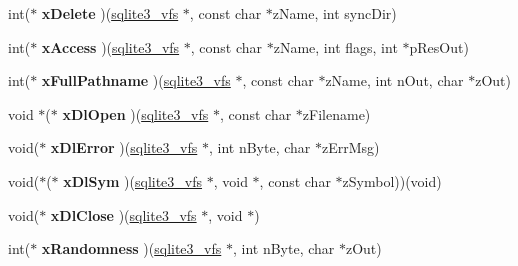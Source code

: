 \begin{DoxyCompactItemize}
\item 
int($\ast$ {\bfseries x\+Delete} )(\hyperlink{structsqlite3__vfs}{sqlite3\+\_\+vfs} $\ast$, const char $\ast$z\+Name, int sync\+Dir)\hypertarget{structsqlite3__vfs_a5f547a3e54f91c7ebef140d51054bbc0}{}\label{structsqlite3__vfs_a5f547a3e54f91c7ebef140d51054bbc0}

\item 
int($\ast$ {\bfseries x\+Access} )(\hyperlink{structsqlite3__vfs}{sqlite3\+\_\+vfs} $\ast$, const char $\ast$z\+Name, int flags, int $\ast$p\+Res\+Out)\hypertarget{structsqlite3__vfs_ab4344474034c2dbc9223a362c65ff235}{}\label{structsqlite3__vfs_ab4344474034c2dbc9223a362c65ff235}

\item 
int($\ast$ {\bfseries x\+Full\+Pathname} )(\hyperlink{structsqlite3__vfs}{sqlite3\+\_\+vfs} $\ast$, const char $\ast$z\+Name, int n\+Out, char $\ast$z\+Out)\hypertarget{structsqlite3__vfs_a02fafc56d26adab5f236df6493a8bd55}{}\label{structsqlite3__vfs_a02fafc56d26adab5f236df6493a8bd55}

\item 
void $\ast$($\ast$ {\bfseries x\+Dl\+Open} )(\hyperlink{structsqlite3__vfs}{sqlite3\+\_\+vfs} $\ast$, const char $\ast$z\+Filename)\hypertarget{structsqlite3__vfs_ad6587e730f4f8bce2b0129664a9a86b9}{}\label{structsqlite3__vfs_ad6587e730f4f8bce2b0129664a9a86b9}

\item 
void($\ast$ {\bfseries x\+Dl\+Error} )(\hyperlink{structsqlite3__vfs}{sqlite3\+\_\+vfs} $\ast$, int n\+Byte, char $\ast$z\+Err\+Msg)\hypertarget{structsqlite3__vfs_a3cda3a00a43861cef4d5554354cdfda4}{}\label{structsqlite3__vfs_a3cda3a00a43861cef4d5554354cdfda4}

\item 
void($\ast$($\ast$ {\bfseries x\+Dl\+Sym} )(\hyperlink{structsqlite3__vfs}{sqlite3\+\_\+vfs} $\ast$, void $\ast$, const char $\ast$z\+Symbol))(void)\hypertarget{structsqlite3__vfs_a20ef3dacb974e3e480782629cbbf7534}{}\label{structsqlite3__vfs_a20ef3dacb974e3e480782629cbbf7534}

\item 
void($\ast$ {\bfseries x\+Dl\+Close} )(\hyperlink{structsqlite3__vfs}{sqlite3\+\_\+vfs} $\ast$, void $\ast$)\hypertarget{structsqlite3__vfs_adaa986b55a44971e7048d160ac5071ad}{}\label{structsqlite3__vfs_adaa986b55a44971e7048d160ac5071ad}

\item 
int($\ast$ {\bfseries x\+Randomness} )(\hyperlink{structsqlite3__vfs}{sqlite3\+\_\+vfs} $\ast$, int n\+Byte, char $\ast$z\+Out)\hypertarget{structsqlite3__vfs_ace3fcb41cb01a947457532f645ba4c88}{}\label{structsqlite3__vfs_ace3fcb41cb01a947457532f645ba4c88}


\end{DoxyCompactItemize}
